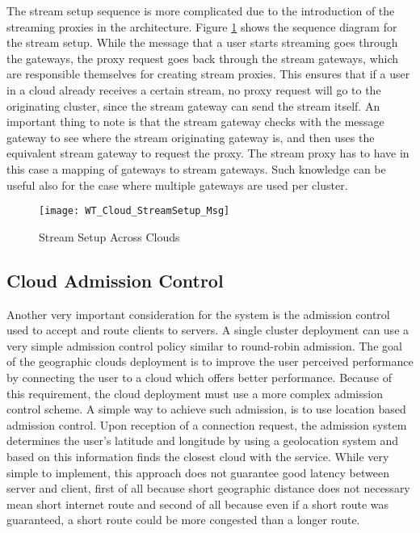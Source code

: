 The stream setup sequence is more complicated due to the introduction of the streaming proxies in the architecture. Figure \ref{fig:cloudstreamsetup} shows the sequence diagram for the stream setup. While the message that a user starts streaming goes through the gateways, the proxy request goes back through the stream gateways, which are responsible themselves for creating stream proxies. This ensures that if a user in a cloud already receives a certain stream, no proxy request will go to the originating cluster, since the stream gateway can send the stream itself. An important thing to note is that the stream gateway checks with the message gateway to see where the stream originating gateway is, and then uses the equivalent stream gateway to request the proxy. The stream proxy has to have in this case a mapping of gateways to stream gateways. Such knowledge can be useful also for the case where multiple gateways are used per cluster.

\begin{figure}
	\centering
	\texttt{[image: WT\_Cloud\_StreamSetup\_Msg]}
	\caption{Stream Setup Across Clouds}
	\label{fig:cloudstreamsetup}
\end{figure}

\subsection{Cloud Admission Control}

Another very important consideration for the system is the admission control used to accept and route clients to servers. A single cluster deployment can use a very simple admission control policy similar to round-robin admission. The goal of the geographic clouds deployment is to improve the user perceived performance by connecting the user to a cloud which offers better performance. Because of this requirement, the cloud deployment must use a more complex admission control scheme. A simple way to achieve such admission, is to use location based admission control. Upon reception of a connection request, the admission system determines the user's latitude and longitude by using a geolocation system and based on this information finds the closest cloud with the service. While very simple to implement, this approach does not guarantee good latency between server and client, first of all because short geographic distance does not necessary mean short internet route and second of all because even if a short route was guaranteed, a short route could be more congested than a longer route.

